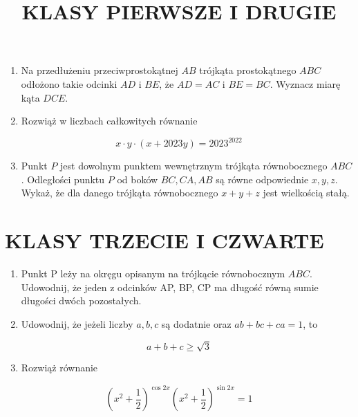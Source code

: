 \documentclass[10pt]{article}
\title{KLASY PIERWSZE I DRUGIE }
\author{}
\date{}
\begin{document}
\maketitle
\begin{enumerate}
  \item Na przedłużeniu przeciwprostokątnej \(A B\) trójkąta prostokątnego \(A B C\) odłożono takie odcinki \(A D\) i \(B E\), że \(A D=A C\) i \(B E=B C\). Wyznacz miarę kąta \(D C E\).
  \item Rozwiąż w liczbach całkowitych równanie
\end{enumerate}

\[
x \cdot y \cdot(x+2023 y)=2023^{2022}
\]

\begin{enumerate}
  \setcounter{enumi}{2}
  \item Punkt \(P\) jest dowolnym punktem wewnętrznym trójkąta równobocznego \(A B C\). Odległości punktu \(P\) od boków \(B C, C A, A B\) są równe odpowiednie \(x, y, z\). Wykaż, że dla danego trójkąta równobocznego \(x+y+z\) jest wielkością stałą.
\end{enumerate}

\section*{KLASY TRZECIE I CZWARTE}
\begin{enumerate}
  \item Punkt P leży na okręgu opisanym na trójkącie równobocznym \(A B C\). Udowodnij, że jeden z odcinków AP, BP, CP ma długość równą sumie długości dwóch pozostałych.
  \item Udowodnij, że jeżeli liczby \(a, b, c\) są dodatnie oraz \(a b+b c+c a=1\), to
\end{enumerate}

\[
a+b+c \geq \sqrt{3}
\]

\begin{enumerate}
  \setcounter{enumi}{2}
  \item Rozwiąż równanie
\end{enumerate}

\[
\left(x^{2}+\frac{1}{2}\right)^{\cos 2 x}\left(x^{2}+\frac{1}{2}\right)^{\sin 2 x}=1
\]
\end{document}
